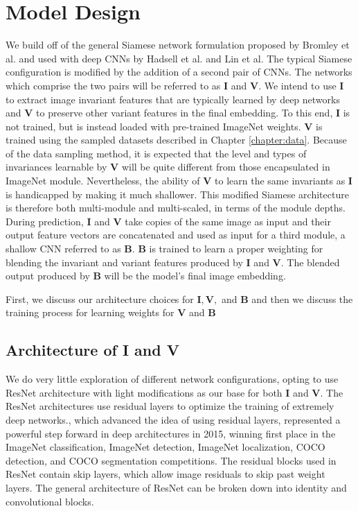 \section{Model Design}
We build off of the general Siamese network formulation proposed by Bromley et al. and used with deep CNNs by Hadsell et al. and Lin et al.\cite{bromley1993signature}\cite{hadsell2006dimensionality}\cite{lin2015learning} The typical Siamese configuration is modified by the addition of a second pair of CNNs. The networks which comprise the two pairs will be referred to as $\mathbf{I}$ and $\mathbf{V}$. We intend to use $\mathbf{I}$ to extract image invariant features that are typically learned by deep networks and $\mathbf{V}$ to preserve other variant features in the final embedding. To this end, $\mathbf{I}$ is not trained, but is instead loaded with pre-trained ImageNet weights. $\mathbf{V}$ is trained using the sampled datasets  described in Chapter \ref{chapter:data}. Because of the data sampling method, it is expected that the level and types of invariances learnable by $\mathbf{V}$ will be quite different from those encapsulated in ImageNet module. Nevertheless, the ability of $\mathbf{V}$ to learn the same invariants as $\mathbf{I}$ is handicapped by making it much shallower. This modified Siamese architecture is therefore both multi-module and multi-scaled, in terms of the module depths. During prediction, $\mathbf{I}$ and $\mathbf{V}$ take copies of the same image as input and their output feature vectors are concatenated and used as input for a third module, a shallow CNN referred to as $\mathbf{B}$. $\mathbf{B}$ is trained to learn a proper weighting for blending the invariant and variant features produced by $\mathbf{I}$ and $\mathbf{V}$. The blended output produced by $\mathbf{B}$ will be the model's final image embedding. 

First, we discuss our architecture choices for $\mathbf{I}, \mathbf{V}, $ and $\mathbf{B}$ and then we discuss the training process for learning weights for $\mathbf{V} $ and $\mathbf{B}$


\subsection{Architecture of I and V}
We do very little exploration of different network configurations, opting to use ResNet architecture with light modifications as our base for both $\mathbf{I}$ and $\mathbf{V}$. The ResNet architectures use residual layers to optimize the training of extremely deep networks., which advanced the idea of using residual layers, represented a powerful step forward in deep architectures in 2015, winning first place in the ImageNet classification, ImageNet detection, ImageNet localization, COCO detection, and COCO segmentation competitions.\cite{He2015} The residual blocks used in ResNet contain skip layers, which allow image residuals to skip past weight layers. The general architecture of ResNet can be broken down into identity and convolutional blocks. 

